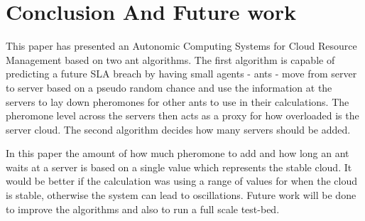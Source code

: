 \documentclass[conference]{IEEEtran}
\begin{document}

\section{Conclusion And Future work}
\label{sec:conclusion}

This paper has presented an Autonomic Computing Systems for Cloud Resource Management based on two ant algorithms. The first algorithm is capable of predicting a future SLA breach by having small agents - ants - move from server to server based on a pseudo random chance and use the information at the servers to lay down pheromones for other ants to use in their calculations. The pheromone level across the servers then acts as a proxy for how overloaded is the server cloud. The second algorithm decides how many servers should be added.

In this paper the amount of how much pheromone to add and how long an ant waits at a server is based on a single value which represents the stable cloud. It would be better if the calculation was using a range of values for when the cloud is stable, otherwise the system can lead to oscillations. Future work will be done to improve the algorithms and also to run a full scale test-bed.





%
%
%






\end{document}
